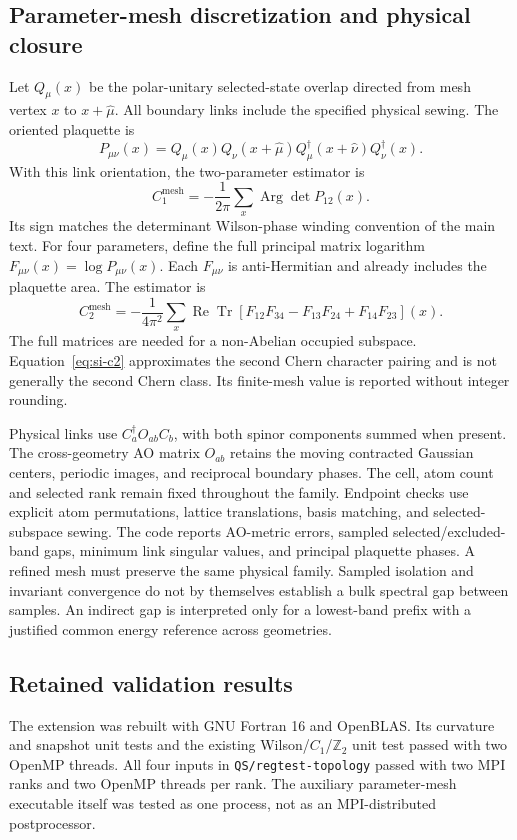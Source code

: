 \documentclass[11pt]{article}
\begin{document}
\subsection{Parameter-mesh discretization and physical closure}
Let $Q_\mu(x)$ be the polar-unitary selected-state overlap directed from
mesh vertex $x$ to $x+\hat\mu$. All boundary links include the specified
physical sewing. The oriented plaquette is
\begin{equation}
 P_{\mu\nu}(x)=Q_\mu(x)Q_\nu(x+\hat\mu)
 Q_\mu^\dagger(x+\hat\nu)Q_\nu^\dagger(x).
\end{equation}
With this link orientation, the two-parameter estimator is
\begin{equation}
 C_1^{\mathrm{mesh}}=-\frac{1}{2\pi}\sum_x
 \operatorname{Arg}\det P_{12}(x).
\end{equation}
Its sign matches the determinant Wilson-phase winding convention of the
main text. For four parameters, define the full principal matrix
logarithm $F_{\mu\nu}(x)=\log P_{\mu\nu}(x)$. Each $F_{\mu\nu}$ is
anti-Hermitian and already includes the plaquette area. The estimator is
\begin{equation}
 C_2^{\mathrm{mesh}}=-\frac{1}{4\pi^2}\sum_x
 \operatorname{Re}\operatorname{Tr}
 \left[F_{12}F_{34}-F_{13}F_{24}+F_{14}F_{23}\right](x).
 \label{eq:si-c2}
\end{equation}
The full matrices are needed for a non-Abelian occupied subspace.
Equation~\eqref{eq:si-c2} approximates the second Chern character pairing
and is not generally the second Chern class. Its finite-mesh value is
reported without integer rounding.

Physical links use $C_a^\dagger O_{ab}C_b$, with both spinor components
summed when present. The cross-geometry AO matrix $O_{ab}$ retains the
moving contracted Gaussian centers, periodic images, and reciprocal
boundary phases. The cell, atom count and selected rank remain fixed
throughout the family. Endpoint checks use explicit atom permutations,
lattice translations, basis matching, and selected-subspace sewing.
The code reports AO-metric errors, sampled selected/excluded-band gaps,
minimum link singular values, and principal plaquette phases. A refined
mesh must preserve the same physical family. Sampled isolation and
invariant convergence do not by themselves establish a bulk spectral
gap between samples. An indirect gap is interpreted only for a lowest-band
prefix with a justified common energy reference across geometries.

\subsection{Retained validation results}
The extension was rebuilt with GNU Fortran 16 and OpenBLAS. Its curvature
and snapshot unit tests and the existing Wilson/$C_1$/$\mathbb Z_2$ unit
test passed with two OpenMP threads. All four inputs in
\texttt{QS/regtest-topology} passed with two MPI ranks and two OpenMP
threads per rank. The auxiliary parameter-mesh executable itself was
tested as one process, not as an MPI-distributed postprocessor.
\end{document}
